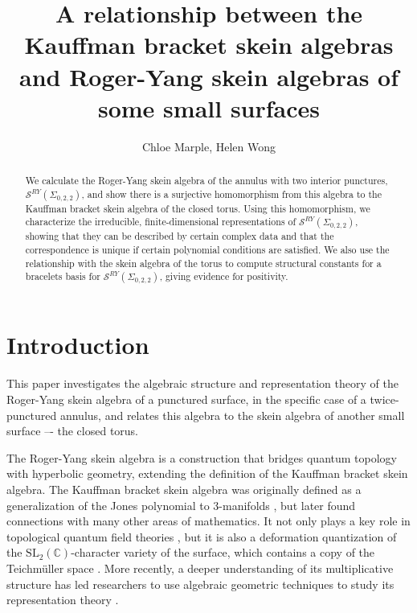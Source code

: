 \documentclass{article}
\title{A relationship between the Kauffman bracket skein algebras and Roger-Yang skein algebras of some small surfaces}
\author{Chloe Marple, Helen Wong}
\date{}
\newcommand{\C}{\mathbb{C}}
\newcommand{\SRY}{\mathcal{S}^{RY}}
\newcommand{\san}{\Sigma_{0,2,2}}
\theoremstyle{definition}
\renewcommand{\arraystretch}{1.5}
\renewcommand{\san}{\Sigma_{0, 2, 2}}
\renewcommand{\SRY}{\ensuremath{ \mathcal S^{RY}}}
\begin{document}
\maketitle

\def\arraystretch{1.2}

\begin{abstract}
We calculate the Roger-Yang skein algebra of the annulus with two interior punctures, $\SRY(\san)$, and show there is a surjective homomorphism from this algebra to the Kauffman bracket skein algebra of the closed torus. Using this homomorphism, we characterize the irreducible, finite-dimensional representations of $\SRY(\san)$, showing that they can be described by certain complex data and that the correspondence is unique if certain polynomial conditions are satisfied. We also use the relationship with the skein algebra of the torus to compute structural constants for a bracelets basis for $\SRY(\san)$, giving evidence for positivity.
\end{abstract} 

\section{Introduction}

This paper investigates the algebraic structure and representation theory of the Roger-Yang skein algebra of a punctured surface, in the specific case of a twice-punctured annulus,  and relates this algebra to the skein algebra of another small surface –- the closed torus.

The Roger-Yang skein algebra is a construction that bridges quantum topology with hyperbolic geometry, extending the definition of the Kauffman bracket skein algebra.  The Kauffman bracket skein algebra was originally defined as a generalization of the Jones polynomial to 3-manifolds \cite{PrzSkeinAlg, TuraevSkeinAlg}, but later found connections with many other areas of mathematics.  It not only plays a key role in topological quantum field theories \cite{BHMV, BCGP}, but it is also a deformation quantization of the $\mathrm{SL}_2(\C)$-character variety of the surface,  which contains a copy of the Teichmüller space \cite{TuraevPoisson, BullockRings, BullockFrohmanJKB, PrzSikora}.  
More recently, a deeper understanding of  its multiplicative structure has led researchers to use algebraic geometric techniques  \cite{FKBLUnicity, GJSUnicity, KKUnicity}
to study its representation theory \cite{BonWonQTrace, BonWonSkeinReps1}.  
\end{document}
